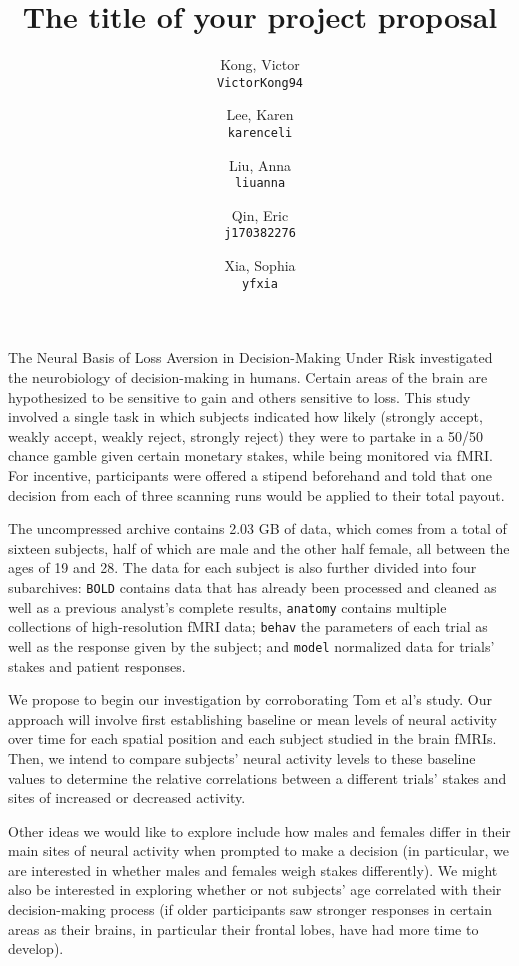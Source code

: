 \documentclass[11pt]{article}
\title{The title of your project proposal}
\author{
  Kong, Victor\\
  \texttt{VictorKong94}
  \and
  Lee, Karen\\
  \texttt{karenceli}
  \and
  Liu, Anna\\
  \texttt{liuanna}
  \and
  Qin, Eric\\
  \texttt{j170382276}
  \and
  Xia, Sophia\\
  \texttt{yfxia}
}
\begin{document}
\maketitle

The Neural Basis of Loss Aversion in Decision-Making Under Risk
\cite{tom2007neural} investigated the neurobiology of decision-making in humans.
Certain areas of the brain are hypothesized to be sensitive to gain and others
sensitive to loss. This study involved a single task in which subjects indicated
how likely (strongly accept, weakly accept, weakly reject, strongly reject) they
were to partake in a 50/50 chance gamble given certain monetary stakes, while
being monitored via fMRI. For incentive, participants were offered a stipend
beforehand and told that one decision from each of three scanning runs would be
applied to their total payout.

The uncompressed archive contains 2.03 GB of data, which comes from a total of
sixteen subjects, half of which are male and the other half female, all between
the ages of 19 and 28. The data for each subject is also further divided into
four subarchives: \texttt{BOLD} contains data that has already been processed
and cleaned as well as a previous analyst's complete results, \texttt{anatomy}
contains multiple collections of high-resolution fMRI data; \texttt{behav} the
parameters of each trial as well as the response given by the subject; and
\texttt{model} normalized data for trials' stakes and patient responses.

We propose to begin our investigation by corroborating Tom et al's study. Our
approach will involve first establishing baseline or mean levels of neural
activity over time for each spatial position and each subject studied in the
brain fMRIs. Then, we intend to compare subjects' neural activity levels to
these baseline values to determine the relative correlations between a different
trials' stakes and sites of increased or decreased activity.

Other ideas we would like to explore include how males and females differ in
their main sites of neural activity when prompted to make a decision (in
particular, we are interested in whether males and females weigh stakes
differently). We might also be interested in exploring whether or not subjects'
age correlated with their decision-making process (if older participants saw
stronger responses in certain areas as their brains, in particular their frontal
lobes, have had more time to develop).


\end{document}
